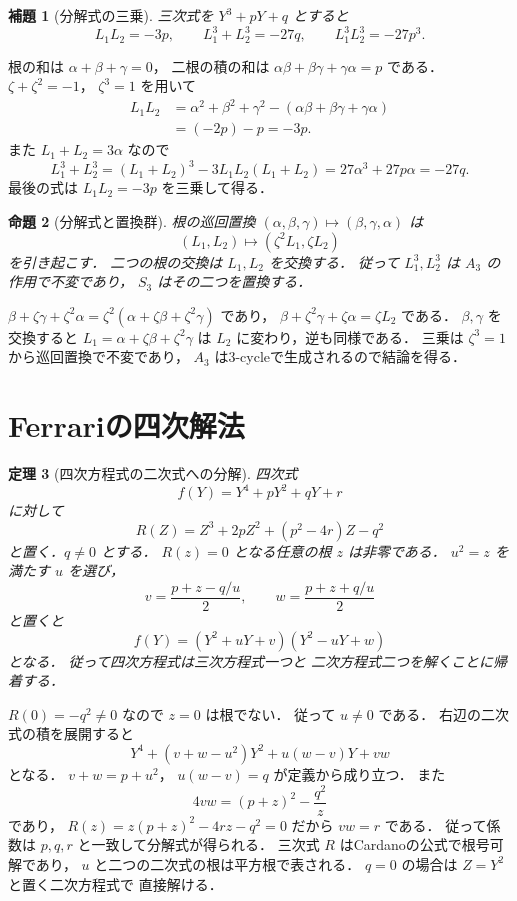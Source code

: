 \documentclass[a5paper,10pt,onecolumn]{jsarticle}
\makeatletter
\theoremstyle{mathnotetheorem}
\newtheorem{theorem}{定理}[section]
\newtheorem{lemma}[theorem]{補題}
\newtheorem{proposition}[theorem]{命題}
\renewcommand{\proofname}{証明}
\renewenvironment{proof}[1][\proofname]{%
  \par\pushQED{\qed}\normalfont\topsep4\p@\@plus2\p@\relax
  \trivlist\item[\hskip\labelsep\bfseries #1]\ignorespaces
}{\popQED\endtrivlist\@endpefalse}
\makeatother
\begin{document}
\begin{lemma}[分解式の三乗]\label{lem:lagrange-cubes}
三次式を $Y^3+pY+q$ とすると
\[
 L_1L_2=-3p,\qquad
 L_1^3+L_2^3=-27q,\qquad
 L_1^3L_2^3=-27p^3.
\]
\end{lemma}
\begin{proof}
根の和は $\alpha+\beta+\gamma=0$，
二根の積の和は
$\alpha\beta+\beta\gamma+\gamma\alpha=p$
である．
$\zeta+\zeta^2=-1$，
$\zeta^3=1$ を用いて
\begin{align*}
 L_1L_2
 &=\alpha^2+\beta^2+\gamma^2
   -(\alpha\beta+\beta\gamma+\gamma\alpha)\\
 &=(-2p)-p=-3p.
\end{align*}
また $L_1+L_2=3\alpha$ なので
\[
 L_1^3+L_2^3
 =(L_1+L_2)^3-3L_1L_2(L_1+L_2)
 =27\alpha^3+27p\alpha=-27q.
\]
最後の式は $L_1L_2=-3p$ を三乗して得る．
\end{proof}

\begin{proposition}[分解式と置換群]\label{prop:lagrange-action}
根の巡回置換
$(\alpha,\beta,\gamma)\mapsto
(\beta,\gamma,\alpha)$ は
\[
 (L_1,L_2)\longmapsto(\zeta^2L_1,\zeta L_2)
\]
を引き起こす．
二つの根の交換は $L_1,L_2$ を交換する．
従って $L_1^3,L_2^3$ は $A_3$ の作用で不変であり，
$S_3$ はその二つを置換する．
\end{proposition}
\begin{proof}
$\beta+\zeta\gamma+\zeta^2\alpha
=\zeta^2(\alpha+\zeta\beta+\zeta^2\gamma)$
であり，
$\beta+\zeta^2\gamma+\zeta\alpha=\zeta L_2$
である．
$\beta,\gamma$ を交換すると
$L_1=\alpha+\zeta\beta+\zeta^2\gamma$
は $L_2$ に変わり，逆も同様である．
三乗は $\zeta^3=1$ から巡回置換で不変であり，
$A_3$ は3-cycleで生成されるので結論を得る．
\end{proof}

\section{Ferrariの四次解法}

\begin{theorem}[四次方程式の二次式への分解]
\label{thm:ferrari}
四次式
\[
 f(Y)=Y^4+pY^2+qY+r
\]
に対して
\[
 R(Z)=Z^3+2pZ^2+(p^2-4r)Z-q^2
\]
と置く．$q\ne0$ とする．
$R(z)=0$ となる任意の根 $z$ は非零である．
$u^2=z$ を満たす $u$ を選び，
\[
 v=\frac{p+z-q/u}{2},\qquad
 w=\frac{p+z+q/u}{2}
\]
と置くと
\[
 f(Y)=(Y^2+uY+v)(Y^2-uY+w)
\]
となる．
従って四次方程式は三次方程式一つと
二次方程式二つを解くことに帰着する．
\end{theorem}
\begin{proof}
$R(0)=-q^2\ne0$ なので $z=0$ は根でない．
従って $u\ne0$ である．
右辺の二次式の積を展開すると
\[
 Y^4+(v+w-u^2)Y^2+u(w-v)Y+vw
\]
となる．
$v+w=p+u^2$，
$u(w-v)=q$ が定義から成り立つ．
また
\[
 4vw=(p+z)^2-\frac{q^2}z
\]
であり，
$R(z)=z(p+z)^2-4rz-q^2=0$ だから
$vw=r$ である．
従って係数は $p,q,r$ と一致して分解式が得られる．
三次式 $R$ はCardanoの公式で根号可解であり，
$u$ と二つの二次式の根は平方根で表される．
$q=0$ の場合は $Z=Y^2$ と置く二次方程式で
直接解ける．
\end{proof}
\end{document}
